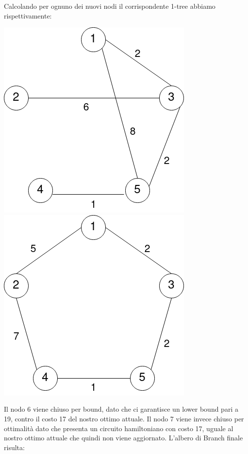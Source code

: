\documentclass[
    article,            %
    12pt,                %
    oneside,            %
    a4paper,            %
    english,            %
    italian,                %
    sumario=tradicional,
]{abntex2}
\begin{document}
    Calcolando per ognuno dei nuovi nodi il corrispondente 1-tree abbiamo rispettivamente:
    \begin{center}
        \includegraphics[scale=0.33]{files/sesto1Tree}
        \qquad
        \qquad
        \includegraphics[scale=0.33]{files/settimo1Tree}
    \end{center}
    Il nodo 6 viene chiuso per bound, dato che ci garantisce un lower bound pari a 19, contro il costo 17 del nostro ottimo attuale.
    Il nodo 7 viene invece chiuso per ottimalità dato che presenta un circuito hamiltoniano con costo 17, uguale al nostro ottimo attuale che quindi non viene aggiornato.
    \newpage
    L'albero di Branch finale risulta:
\end{document}

